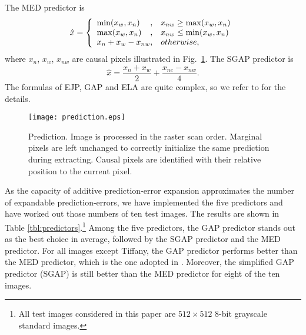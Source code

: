 \documentclass{sig-alternate}
\begin{document}
The MED predictor is
\begin{equation}\label{eqn:med1}
  \hat{x} = \left\{ \begin{array}{l@{,\quad}l}
      \min(x_w,x_n)     & x_{nw} \ge \max(x_w,x_n) \\
      \max(x_w,x_n)     & x_{nw} \le \min(x_w,x_n) \\
      x_n + x_w - x_{nw}    & otherwise,
\end{array} \right.
\end{equation}
where $x_n$, $x_w$, $x_{nw}$ are causal pixels illustrated in Fig.\ \ref{fig:prediction}. The SGAP
predictor is
\begin{equation}\label{eqn:sgap}
  \hat{x} = \frac{x_n + x_w}{2} + \frac{x_{ne} - x_{nw}}{4}.
\end{equation}
The formulas of EJP, GAP and ELA are quite complex, so we refer to
\cite{Enhancedjpegls,Wu97calic2,Kau05lsap} for the details.

\begin{figure}[t]
  \centering
  \texttt{[image: prediction.eps]}
  \caption{\label{fig:prediction}Prediction. Image is processed in the raster scan order. Marginal
  pixels are left unchanged to correctly initialize the same prediction during extracting. Causal
  pixels are identified with their relative position to the current pixel.}
\end{figure}

As the capacity of additive prediction-error expansion approximates the number of expandable
prediction-errors, we have implemented the five predictors and have worked out those numbers of ten
test images. The results are shown in Table \ref{tbl:predictors}.\footnote{All test images
considered in this paper are $512 \times 512$ 8-bit grayscale standard images.} Among the five
predictors, the GAP predictor stands out as the best choice in average, followed by the SGAP
predictor and the MED predictor. For all images except Tiffany, the GAP predictor performs better
than the MED predictor, which is the one adopted in \cite{Thodi07pee,Kuribayashi08,Hu2009}.
Moreover, the simplified GAP predictor (SGAP) is still better than the MED predictor for eight of
the ten images.
\end{document}
